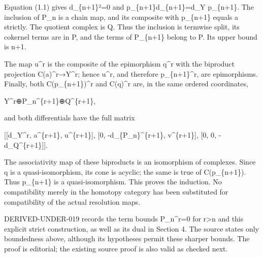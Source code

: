 Equation (1.1)\allowbreak{} gives d\_\allowbreak{}\{n\allowbreak{}+1\}²\allowbreak{}=0 and p\_\allowbreak{}\{n\allowbreak{}+1\}d\_\allowbreak{}\{n\allowbreak{}+1\}\allowbreak{}=d\_\allowbreak{}Y p\_\allowbreak{}\{n\allowbreak{}+1\}. The inclusion of P\_\allowbreak{}n is a chain map,\allowbreak{} and its composite with p\_\allowbreak{}\{n\allowbreak{}+1\} equals a strictly. The quotient complex is Q. Thus the inclusion is termwise split,\allowbreak{} its cokernel terms are in P,\allowbreak{} and the terms of P\_\allowbreak{}\{n\allowbreak{}+1\} belong to P. Its upper bound is n\allowbreak{}+1.

The map u\^{}r is the composite of the epimorphism q\^{}r with the biproduct projection C(a)\allowbreak{}\textasciicircum{}r\allowbreak{}→Y\textasciicircum{}r; hence u\textasciicircum{}r,\allowbreak{} and therefore p\_\allowbreak{}\{n\allowbreak{}+1\}\textasciicircum{}r,\allowbreak{} are epimorphisms. Finally,\allowbreak{} both C(p\_\allowbreak{}\{n\allowbreak{}+1\})\allowbreak{}\textasciicircum{}r and C(q)\allowbreak{}\textasciicircum{}r are,\allowbreak{} in the same ordered coordinates,\allowbreak{}

Y\textasciicircum{}r\allowbreak{}⊕P\_\allowbreak{}n\textasciicircum{}\{r\allowbreak{}+1\}\allowbreak{}⊕Q\textasciicircum{}\{r\allowbreak{}+1\},\allowbreak{}

and both differentials have the full matrix

[[d\_\allowbreak{}Y\textasciicircum{}r,\allowbreak{} a\textasciicircum{}\{r\allowbreak{}+1\},\allowbreak{} u\textasciicircum{}\{r\allowbreak{}+1\}]\allowbreak{},\allowbreak{} [0,\allowbreak{} -d\_\allowbreak{}\{P\_\allowbreak{}n\}\textasciicircum{}\{r\allowbreak{}+1\},\allowbreak{} v\textasciicircum{}\{r\allowbreak{}+1\}]\allowbreak{},\allowbreak{} [0,\allowbreak{} 0,\allowbreak{} -d\_\allowbreak{}Q\textasciicircum{}\{r\allowbreak{}+1\}]\allowbreak{}]\allowbreak{}.

The associativity map of these biproducts is an isomorphism of complexes. Since q is a quasi-isomorphism,\allowbreak{} its cone is acyclic; the same is true of C(p\_\allowbreak{}\{n\allowbreak{}+1\})\allowbreak{}. Thus p\_\allowbreak{}\{n\allowbreak{}+1\} is a quasi-isomorphism. This proves the induction. No compatibility merely in the homotopy category has been substituted for compatibility of the actual resolution maps.

DERIVED-UNDER-019 records the term bounds P\_\allowbreak{}n\textasciicircum{}r\allowbreak{}=0 for r\textgreater n and this explicit strict construction,\allowbreak{} as well as its dual in Section 4. The source states only boundedness above,\allowbreak{} although its hypotheses permit these sharper bounds. The proof is editorial; the existing source proof is also valid as checked next.

